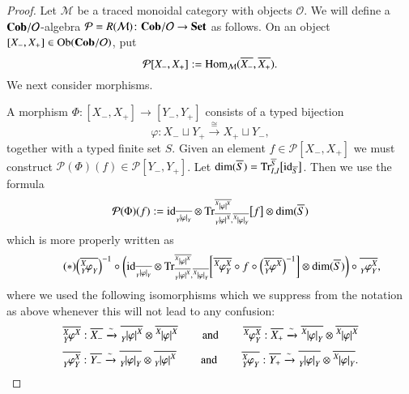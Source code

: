 \documentclass{amsart}
\def\tn{\textnormal}
\def\mc{\mathcal}
\def\Hom{\tn{Hom}}
\def\Ob{\tn{Ob}}
\def\dim{\tn{dim}}
\def\Trace{\tn{Tr}}
\def\hsp{\hspace{.3in}}
\def\to{\rightarrow}
\def\taking{\colon}
\def\too{\longrightarrow}
\def\iso{\cong}
\def\ol{\overline}
\newcommand{\To}[1]{\xrightarrow{#1}}
\def\id{\tn{id}}
\def\Cob{{\bf Cob}}
\def\Set{{\bf Set}}
\def\mcM{\mc{M}}
\def\mcO{\mc{O}}
\def\mcP{\mc{P}}
\newcommand{\inp}[1]{{#1_-}}
\newcommand{\outp}[1]{{#1_+}}
\newcommand{\feeddd}[3]{{\tensor*[^{#2}_{\color{white}{!}}]{{|#1|}}{^{#3}}}}%
\newcommand{\feeddc}[3]{{\tensor*[^{#2}]{{|#1|}}{_{#3}}}}
\newcommand{\feedcd}[3]{{\tensor*[_{#2}]{{|#1|}}{^{#3}}}}
\newcommand{\feedcc}[3]{{\tensor*[^{\color{white}{!}}_{#2}]{{|#1|}}{_{#3}}}}
\newcommand{\feedda}[3]{{\tensor*[^{#2}_{\color{white}{!}}]{{#1}}{^{#2}_{#3}}}}
\newcommand{\feedca}[3]{{\tensor*[_{#2}]{{#1}}{_{#2}^{#3}}}}
\newcommand{\feedad}[3]{{\tensor*[^{#2}_{#3}]{{#1}}{^{#2}}}}
\newcommand{\feedac}[3]{{\tensor*[_{#2}^{#3}]{{#1}}{_{#2}}}}
\newcommand{\vLst}[1]{\ol{#1}}
\newcommand{\vinp}[1]{\vLst{\inp{#1}}}
\newcommand{\voutp}[1]{\vLst{\outp{#1}}}
\theoremstyle{remark}
\theoremstyle{definition}
\begin{document}
\begin{proof}

Let $\mcM$ be a traced monoidal category with objects $\mcO$. We will define a $\Cob/\mcO$-algebra $\mcP=R(\mcM)\taking\Cob/\mcO\to\Set$ as follows. On an object $[\inp{X},\outp{X}]\in\Ob(\Cob/\mcO)$, put 
$$\mcP[\inp{X},\outp{X}]:=\Hom_{\mcM}(\vinp{X},\voutp{X}).$$
We next consider morphisms.


A morphism $\Phi\taking[\inp{X},\outp{X}]\too[\inp{Y},\outp{Y}]$ consists of a typed bijection 
$$\varphi\taking\inp{X}\sqcup \outp{Y}\To{\iso}\outp{X}\sqcup \inp{Y},$$ 
together with a typed finite set $S$. Given an element $f\in\mcP[\inp{X},\outp{X}]$ we must construct $\mcP(\Phi)(f)\in\mcP[\inp{Y},\outp{Y}]$. Let $\dim(\ol{S})=\Trace^{\ol{S}}_{I,I}\big[\id_{\ol{S}}\big]$. Then we use the formula
$$\mcP(\Phi)(f):=
\id_{\ol{\feedcc{\varphi}{Y}{Y}}}\otimes\Trace^{\ol{\feeddd{\varphi}{X}{X}}}_{\ol{\feedcd{\varphi}{Y}{X}},\ol{\feeddc{\varphi}{X}{Y}}}\big[f\big]
\otimes\dim(\ol{S})
$$
which is more properly written as
\[\tag{$*$}\Big(\ol{\feedac{\varphi}{Y}{X}}\Big)^{-1}\circ\bigg(\id_{\ol{\feedcc{\varphi}{Y}{Y}}}\otimes\Trace^{\ol{\feeddd{\varphi}{X}{X}}}_{\ol{\feedcd{\varphi}{Y}{X}},\ol{\feeddc{\varphi}{X}{Y}}}\bigg[\ol{\feedda{\varphi}{X}{Y}}\circ f\circ\Big(\ol{\feedad{\varphi}{X}{Y}}\Big)^{-1}\bigg]
\otimes\dim(\ol{S})\bigg)\circ\ol{\feedca{\varphi}{Y}{X}},\]
where we used the following isomorphisms which we suppress from the notation as above whenever this will not lead to any confusion:
$$
\ol{\feedad{\varphi}{X}{Y}}:\ol{\inp{X}}\To{\sim}\ol{\feedcd{\varphi}{Y}{X}}\otimes\ol{\feeddd{\varphi}{X}{X}}
\hsp\tn{and}\hsp
\ol{\feedda{\varphi}{X}{Y}}:\ol{\outp{X}}\To{\sim}\ol{\feeddc{\varphi}{X}{Y}}\otimes\ol{\feeddd{\varphi}{X}{X}}
$$
$$
\ol{\feedca{\varphi}{Y}{X}}:\ol{\inp{Y}}\To{\sim}\ol{\feedcc{\varphi}{Y}{Y}}\otimes\ol{\feedcd{\varphi}{Y}{X}}
\hsp\tn{and}\hsp
\ol{\feedac{\varphi}{Y}{X}}:\ol{\outp{Y}}\To{\sim}\ol{\feedcc{\varphi}{Y}{Y}}\otimes\ol{\feeddc{\varphi}{X}{Y}}.
$$


\end{proof}
\end{document}
